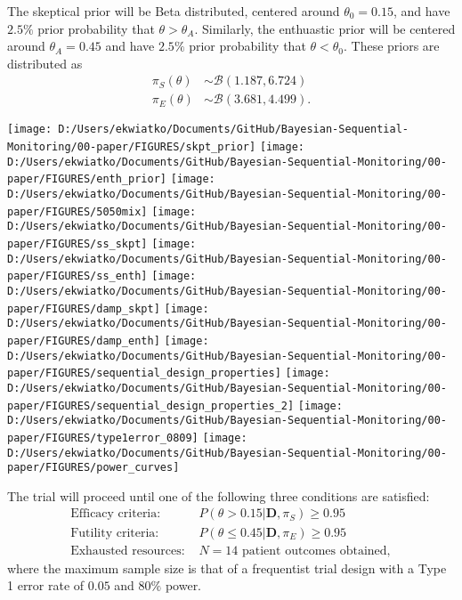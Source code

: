 \documentclass[12pt]{article}
\begin{document}
The skeptical prior will be Beta distributed, centered around $\theta_0=0.15$, and have $2.5\%$ prior probability that $\theta>\theta_A$. Similarly, the enthuastic prior will be centered around $\theta_A=0.45$ and have $2.5\%$ prior probability that $\theta<\theta_0$. These priors are distributed as
\begin{align*}
\pi_S(\theta)&\sim\mathcal{B}(1.187,6.724)\\
\pi_E(\theta)&\sim\mathcal{B}(3.681,4.499).
\end{align*}
\begin{center}
\texttt{[image: D:/Users/ekwiatko/Documents/GitHub/Bayesian-Sequential-Monitoring/00-paper/FIGURES/skpt\_prior]}
\texttt{[image: D:/Users/ekwiatko/Documents/GitHub/Bayesian-Sequential-Monitoring/00-paper/FIGURES/enth\_prior]}
\texttt{[image: D:/Users/ekwiatko/Documents/GitHub/Bayesian-Sequential-Monitoring/00-paper/FIGURES/5050mix]}
\texttt{[image: D:/Users/ekwiatko/Documents/GitHub/Bayesian-Sequential-Monitoring/00-paper/FIGURES/ss\_skpt]}
\texttt{[image: D:/Users/ekwiatko/Documents/GitHub/Bayesian-Sequential-Monitoring/00-paper/FIGURES/ss\_enth]}
\texttt{[image: D:/Users/ekwiatko/Documents/GitHub/Bayesian-Sequential-Monitoring/00-paper/FIGURES/damp\_skpt]}
\texttt{[image: D:/Users/ekwiatko/Documents/GitHub/Bayesian-Sequential-Monitoring/00-paper/FIGURES/damp\_enth]}
\texttt{[image: D:/Users/ekwiatko/Documents/GitHub/Bayesian-Sequential-Monitoring/00-paper/FIGURES/sequential\_design\_properties]}
\texttt{[image: D:/Users/ekwiatko/Documents/GitHub/Bayesian-Sequential-Monitoring/00-paper/FIGURES/sequential\_design\_properties\_2]}
\texttt{[image: D:/Users/ekwiatko/Documents/GitHub/Bayesian-Sequential-Monitoring/00-paper/FIGURES/type1error\_0809]}
\texttt{[image: D:/Users/ekwiatko/Documents/GitHub/Bayesian-Sequential-Monitoring/00-paper/FIGURES/power\_curves]}
\end{center}
The trial will proceed until one of the following three conditions are satisfied:
\begin{align*}
\text{Efficacy criteria: }&P(\theta>0.15|\mathbf{D},\pi_S)\geq 0.95\\
\text{Futility criteria: }&P(\theta\leq 0.45|\mathbf{D},\pi_E)\geq 0.95\\
\text{Exhausted resources: }&N=14 \text{ patient outcomes obtained},
\end{align*}
where the maximum sample size is that of a frequentist trial design with a Type 1 error rate of $0.05$ and $80\%$ power.
\end{document}
